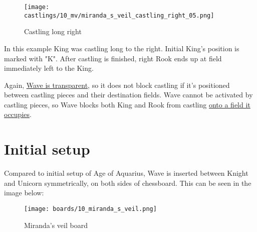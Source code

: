 \vspace*{-0.7\baselineskip}
\noindent
\begin{figure}[!h]
\texttt{[image: castlings/10\_mv/miranda\_s\_veil\_castling\_right\_05.png]}
\caption{Castling long right}
\label{fig:miranda_s_veil_castling_right_05}
\end{figure}

In this example King was castling long to the right. Initial King's position is marked with "K".
After castling is finished, right Rook ends up at field immediately left to the King.

Again, \hyperref[fig:scn_mv_07_wave_is_transparent]{Wave is transparent}, so it does
not block castling if it's positioned between castling pieces and their destination
fields.
Wave cannot be activated by castling pieces, so Wave blocks both King and Rook from castling
\hyperref[fig:scn_mv_11_wave_block_castling_rook]{onto a field it occupies}.

\clearpage %

\section*{Initial setup}
\label{sec:Miranda's veil/Initial setup}

Compared to initial setup of Age of Aquarius, Wave is inserted between Knight and Unicorn
symmetrically, on both sides of chessboard. This can be seen in the image below:

\noindent
\begin{figure}[h]
\texttt{[image: boards/10\_miranda\_s\_veil.png]}
\caption{Miranda's veil board}
\label{fig:10_miranda_s_veil}
\end{figure}

\clearpage %

